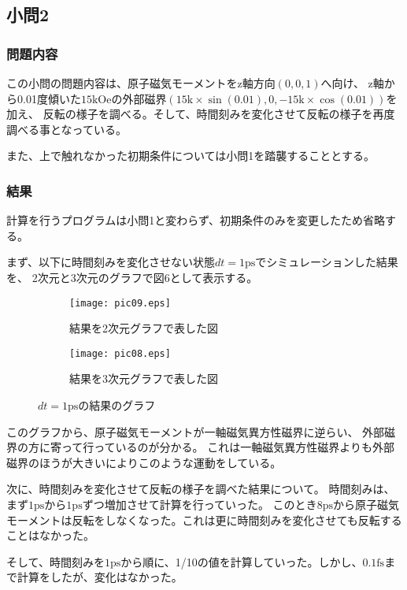\documentclass{jsarticle}
\begin{document}
\subsection{小問2}
\subsubsection{問題内容}
この小問の問題内容は、原子磁気モーメントをz軸方向$(0,0,1)$へ向け、
z軸から0.01度傾いた$15\mathrm{kOe}$の外部磁界$(15\mathrm{k}\times\sin(0.01),0,-15\mathrm{k}\times\cos(0.01))$を加え、
反転の様子を調べる。そして、時間刻みを変化させて反転の様子を再度調べる事となっている。

また、上で触れなかった初期条件については小問1を踏襲することとする。

\subsubsection{結果}
計算を行うプログラムは小問1と変わらず、初期条件のみを変更したため省略する。

まず、以下に時間刻みを変化させない状態$dt = 1\mathrm{ps}$でシミュレーションした結果を、
2次元と3次元のグラフで図6として表示する。
\begin{figure}[H]
	\centering
	\begin{subfigure}{0.49\columnwidth}
		\centering
		\texttt{[image: pic09.eps]}
		\caption{結果を2次元グラフで表した図}
	\end{subfigure}
	\begin{subfigure}{0.49\columnwidth}
		\centering
		\texttt{[image: pic08.eps]}
		\caption{結果を3次元グラフで表した図}
	\end{subfigure}
	\label{fig06}
	\caption{$dt = 1\mathrm{ps}$の結果のグラフ}
\end{figure}

このグラフから、原子磁気モーメントが一軸磁気異方性磁界に逆らい、
外部磁界の方に寄って行っているのが分かる。
これは一軸磁気異方性磁界よりも外部磁界のほうが大きいによりこのような運動をしている。

次に、時間刻みを変化させて反転の様子を調べた結果について。
時間刻みは、まず$1\mathrm{ps}$から$1\mathrm{ps}$ずつ増加させて計算を行っていった。
このとき$8\mathrm{ps}$から原子磁気モーメントは反転をしなくなった。これは更に時間刻みを変化させても反転することはなかった。

そして、時間刻みを$1\mathrm{ps}$から順に、1/10の値を計算していった。しかし、$0.1\mathrm{fs}$まで計算をしたが、変化はなかった。
\end{document}
